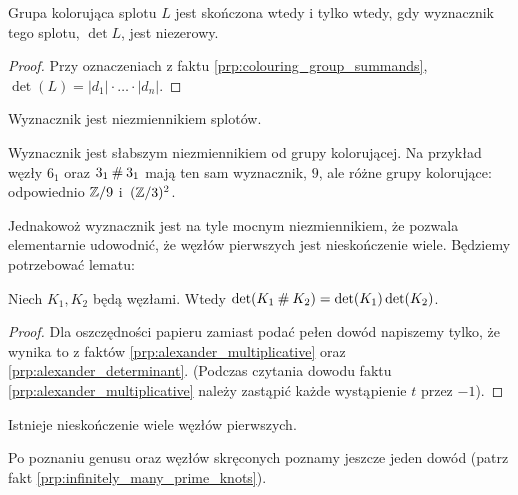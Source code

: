 \begin{corollary}
    Grupa kolorująca splotu $L$ jest skończona wtedy i tylko wtedy, gdy wyznacznik tego splotu, $\det L$, jest niezerowy.
\end{corollary}

\begin{proof}
    Przy oznaczeniach z faktu \ref{prp:colouring_group_summands}, $\det(L) = |d_1| \cdot \ldots \cdot |d_n|$.
\end{proof}

\begin{corollary}
%
\label{cor:determinant_invariant}%
    Wyznacznik jest niezmiennikiem splotów.
\end{corollary}

Wyznacznik jest słabszym niezmiennikiem od grupy kolorującej.
Na przykład węzły $6_1$ oraz $3_1 \mathbin{\#} 3_1$ mają ten sam wyznacznik, $9$, ale różne grupy kolorujące: odpowiednio $\mathbb Z/9$ i~$(\mathbb Z/3)^2$.

Jednakowoż wyznacznik jest na tyle mocnym niezmiennikiem, że pozwala elementarnie udowodnić, że węzłów pierwszych jest nieskończenie wiele.
Będziemy potrzebować lematu:

\begin{lemma}
\label{lem:det_multiplicativ}%
    Niech $K_1, K_2$ będą węzłami.
    Wtedy $\det(K_1 \mathbin{\#} K_2) = \det(K_1) \det(K_2)$.
\end{lemma}

\begin{proof}
    Dla oszczędności papieru zamiast podać pełen dowód napiszemy tylko, że wynika to z faktów \ref{prp:alexander_multiplicative} oraz \ref{prp:alexander_determinant}.
    (Podczas czytania dowodu faktu \ref{prp:alexander_multiplicative} należy zastąpić każde wystąpienie $t$ przez $-1$).
\end{proof}

\begin{proposition}
\label{prop:infinite_prime_knots_1}%
    Istnieje nieskończenie wiele węzłów pierwszych.
\end{proposition}

Po poznaniu genusu oraz węzłów skręconych poznamy jeszcze jeden dowód (patrz fakt \ref{prp:infinitely_many_prime_knots}).

